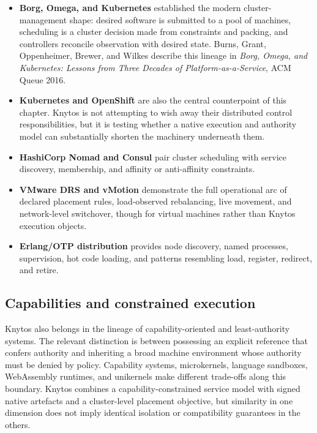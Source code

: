 \begin{itemize}
    \item \textbf{Borg, Omega, and Kubernetes} established the modern
        cluster-management shape: desired software is submitted to a pool of
        machines, scheduling is a cluster decision made from constraints and
        packing, and controllers reconcile observation with desired state.
        Burns, Grant, Oppenheimer, Brewer, and Wilkes describe this lineage in
        \emph{Borg, Omega, and Kubernetes: Lessons from Three Decades of
        Platform-as-a-Service}, ACM Queue 2016.

    \item \textbf{Kubernetes and OpenShift} are also the central counterpoint
        of this chapter. Knytos is not attempting to wish away their
        distributed control responsibilities, but it is testing whether a native
        execution and authority model can substantially shorten the machinery
        underneath them.

    \item \textbf{HashiCorp Nomad and Consul} pair cluster scheduling with
        service discovery, membership, and affinity or anti-affinity
        constraints.

    \item \textbf{VMware DRS and vMotion} demonstrate the full operational
        arc of declared placement rules, load-observed rebalancing, live
        movement, and network-level switchover, though for virtual machines
        rather than Knytos execution objects.

    \item \textbf{Erlang/OTP distribution} provides node discovery, named
        processes, supervision, hot code loading, and patterns resembling
        load, register, redirect, and retire.
\end{itemize}

\subsection{Capabilities and constrained execution}

Knytos also belongs in the lineage of capability-oriented and
least-authority systems. The relevant distinction is between possessing an
explicit reference that confers authority and inheriting a broad machine
environment whose authority must be denied by policy. Capability systems,
microkernels, language sandboxes, WebAssembly runtimes, and unikernels make
different trade-offs along this boundary. Knytos combines a
capability-constrained service model with signed native artefacts and a
cluster-level placement objective, but similarity in one dimension does not
imply identical isolation or compatibility guarantees in the others.

